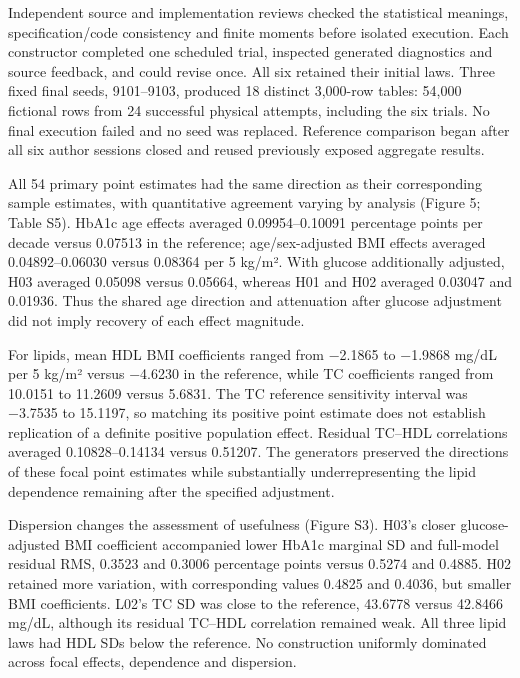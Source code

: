 \documentclass[11pt,letterpaper]{article}
\begin{document}
Independent source and implementation reviews checked the statistical meanings, specification/\allowbreak{}code consistency and finite moments before isolated execution. Each constructor completed one scheduled trial, inspected generated diagnostics and source feedback, and could revise once. All six retained their initial laws. Three fixed final seeds, 9101–\allowbreak{}9103, produced 18 distinct 3,000-row tables: 54,000 fictional rows from 24 successful physical attempts, including the six trials. No final execution failed and no seed was replaced. Reference comparison began after all six author sessions closed and reused previously exposed aggregate results.


All 54 primary point estimates had the same direction as their corresponding sample estimates, with quantitative agreement varying by analysis (Figure 5; Table S5). HbA1c age effects averaged 0.09954–\allowbreak{}0.10091 percentage points per decade versus 0.07513 in the reference; age/\allowbreak{}sex-adjusted BMI effects averaged 0.04892–\allowbreak{}0.06030 versus 0.08364 per 5 kg/\allowbreak{}m². With glucose additionally adjusted, H03 averaged 0.05098 versus 0.05664, whereas H01 and H02 averaged 0.03047 and 0.01936. Thus the shared age direction and attenuation after glucose adjustment did not imply recovery of each effect magnitude.


For lipids, mean HDL BMI coefficients ranged from −2.1865 to −1.9868 mg/\allowbreak{}dL per 5 kg/\allowbreak{}m² versus −4.6230 in the reference, while TC coefficients ranged from 10.0151 to 11.2609 versus 5.6831. The TC reference sensitivity interval was −3.7535 to 15.1197, so matching its positive point estimate does not establish replication of a definite positive population effect. Residual TC–\allowbreak{}HDL correlations averaged 0.10828–\allowbreak{}0.14134 versus 0.51207. The generators preserved the directions of these focal point estimates while substantially underrepresenting the lipid dependence remaining after the specified adjustment.


Dispersion changes the assessment of usefulness (Figure S3). H03's closer glucose-adjusted BMI coefficient accompanied lower HbA1c marginal SD and full-model residual RMS, 0.3523 and 0.3006 percentage points versus 0.5274 and 0.4885. H02 retained more variation, with corresponding values 0.4825 and 0.4036, but smaller BMI coefficients. L02's TC SD was close to the reference, 43.6778 versus 42.8466 mg/\allowbreak{}dL, although its residual TC–\allowbreak{}HDL correlation remained weak. All three lipid laws had HDL SDs below the reference. No construction uniformly dominated across focal effects, dependence and dispersion.
\end{document}

